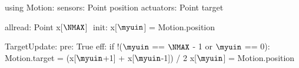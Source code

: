 using Motion:
  sensors: Point position
  actuators: Point target

allread: Point x[$\NMAX$] $\label{lineform-allread}$
init:
  x[$\myuin$] = Motion.position

TargetUpdate:
  pre: True
  eff:
    if !($\myuin$ == $\NMAX$ - 1 or $\myuin$ == 0):
      Motion.target = (x[$\myuin$+1] + x[$\myuin$-1]) / 2
      x[$\myuin$] = Motion.position